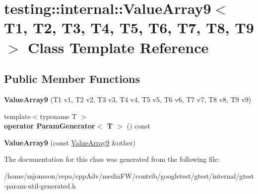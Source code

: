 \hypertarget{classtesting_1_1internal_1_1ValueArray9}{}\section{testing\+:\+:internal\+:\+:Value\+Array9$<$ T1, T2, T3, T4, T5, T6, T7, T8, T9 $>$ Class Template Reference}
\label{classtesting_1_1internal_1_1ValueArray9}
\subsection*{Public Member Functions}
\begin{DoxyCompactItemize}
\item 
\mbox{\label{classtesting_1_1internal_1_1ValueArray9_a4985545b509dc5d7db659cd31b110c21}} 
{\bfseries Value\+Array9} (T1 v1, T2 v2, T3 v3, T4 v4, T5 v5, T6 v6, T7 v7, T8 v8, T9 v9)
\item 
\mbox{\label{classtesting_1_1internal_1_1ValueArray9_aede7e5849cfab0504c49673d5c5c4cce}} 
{\footnotesize template$<$typename T $>$ }\\{\bfseries operator Param\+Generator$<$ T $>$} () const
\item 
\mbox{\label{classtesting_1_1internal_1_1ValueArray9_ab251d9c7a0df5c8034ecda38eadd030a}} 
{\bfseries Value\+Array9} (const \hyperlink{classtesting_1_1internal_1_1ValueArray9}{Value\+Array9} \&other)
\end{DoxyCompactItemize}


The documentation for this class was generated from the following file\+:\begin{DoxyCompactItemize}
\item 
/home/mjonsson/repo/cpp\+Adv/media\+F\+W/contrib/googletest/gtest/internal/gtest-\/param-\/util-\/generated.\+h\end{DoxyCompactItemize}
